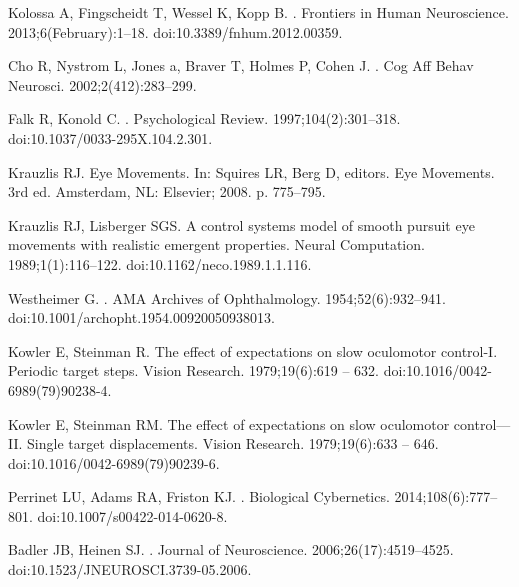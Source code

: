 \documentclass[10pt,letterpaper]{article}
\begin{document}
\begin{thebibliography}{10}
Kolossa A, Fingscheidt T, Wessel K, Kopp B.
.
\newblock Frontiers in Human Neuroscience. 2013;6(February):1--18.
\newblock doi:{10.3389/fnhum.2012.00359}.

Cho R, Nystrom L, Jones a, Braver T, Holmes P, Cohen J.
.
\newblock Cog Aff Behav Neurosci. 2002;2(412):283--299.

Falk R, Konold C.
.
\newblock Psychological Review. 1997;104(2):301--318.
\newblock doi:{10.1037/0033-295X.104.2.301}.

Krauzlis RJ.
\newblock Eye Movements.
\newblock In: Squires LR, Berg D, editors. Eye Movements. 3rd ed. Amsterdam,
  NL: Elsevier; 2008. p. 775--795.

Krauzlis RJ, Lisberger SGS.
\newblock A control systems model of smooth pursuit eye movements with
  realistic emergent properties.
\newblock Neural Computation. 1989;1(1):116--122.
\newblock doi:{10.1162/neco.1989.1.1.116}.

Westheimer G.
.
\newblock AMA Archives of Ophthalmology. 1954;52(6):932--941.
\newblock doi:{10.1001/archopht.1954.00920050938013}.

Kowler E, Steinman R.
\newblock The effect of expectations on slow oculomotor control-I. Periodic
  target steps.
\newblock Vision Research. 1979;19(6):619 -- 632.
\newblock doi:{10.1016/0042-6989(79)90238-4}.

Kowler E, Steinman RM.
\newblock The effect of expectations on slow oculomotor control---II. Single
  target displacements.
\newblock Vision Research. 1979;19(6):633 -- 646.
\newblock doi:{10.1016/0042-6989(79)90239-6}.

Perrinet LU, Adams RA, Friston KJ.
.
\newblock Biological Cybernetics. 2014;108(6):777--801.
\newblock doi:{10.1007/s00422-014-0620-8}.

Badler JB, Heinen SJ.
.
\newblock Journal of Neuroscience. 2006;26(17):4519--4525.
\newblock doi:{10.1523/JNEUROSCI.3739-05.2006}.


\end{thebibliography}
\end{document}
